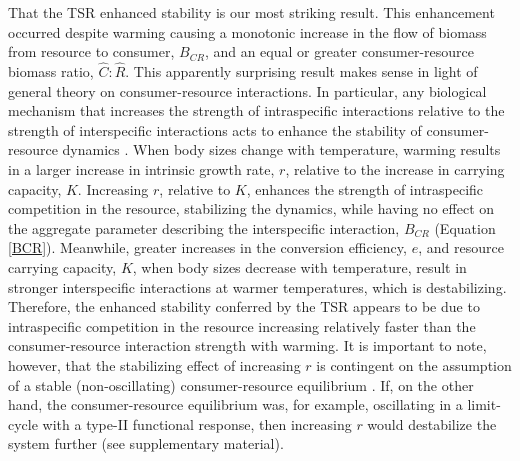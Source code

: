 \documentclass[11pt]{article}
\begin{document}
That the TSR enhanced stability is our most striking result. 
This enhancement occurred despite warming causing a monotonic increase in the flow of biomass from resource to consumer, $B_{CR}$, and an equal or greater consumer-resource biomass ratio, $\hat{C}:\hat{R}$. 
This apparently surprising result makes sense in light of general theory on consumer-resource interactions. 
In particular, any biological mechanism that increases the strength of intraspecific interactions relative to the strength of interspecific interactions acts to enhance the stability of consumer-resource dynamics \citep{McCann2011,Chesson2008}.
When body sizes change with temperature, warming results in a larger increase in intrinsic growth rate, $r$, relative to the increase in carrying capacity, $K$.
Increasing $r$, relative to $K$, enhances the strength of intraspecific competition in the resource, stabilizing the dynamics, while having no effect on the aggregate parameter describing the interspecific interaction, $B_{CR}$ (Equation \ref{BCR}).
Meanwhile, greater increases in the conversion efficiency, $e$,
and resource carrying capacity, $K$, when body sizes decrease with temperature, result in stronger interspecific interactions at warmer temperatures, which is destabilizing.  
Therefore, the enhanced stability conferred by the TSR appears to be due to intraspecific competition in the resource increasing relatively faster than the consumer-resource interaction strength with warming. 
It is important to note, however, that the stabilizing effect of increasing $r$ is contingent on the assumption of a stable (non-oscillating) consumer-resource equilibrium \citep{McCann2011,May1976,Nilsson2016}. 
If, on the other hand, the consumer-resource equilibrium was, for example, oscillating in a limit-cycle with a type-II functional response, then increasing $r$ would destabilize the system further (see supplementary material).
\end{document}
